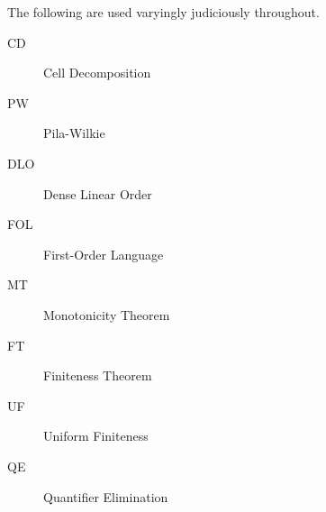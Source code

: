 %
%


The following are used varyingly judiciously throughout.
\begin{description}
\item[CD]{Cell Decomposition}
\item[PW]{Pila-Wilkie}
\item[DLO]{Dense Linear Order}
\item[FOL]{First-Order Language}
\item[MT]{Monotonicity Theorem}
\item[FT]{Finiteness Theorem}
\item[UF]{Uniform Finiteness}
\item[QE]{Quantifier Elimination}
\end{description}
